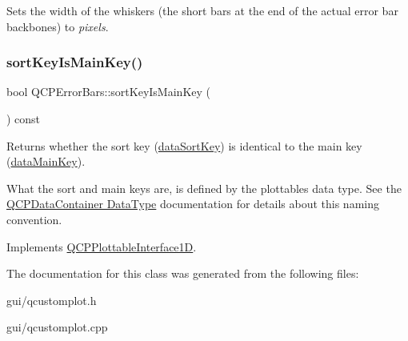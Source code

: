 Sets the width of the whiskers (the short bars at the end of the actual error bar backbones) to {\itshape pixels}. \mbox{\label{classQCPErrorBars_af75958b95d9b9c7edfd9851c1d123850}} 
\subsubsection{\texorpdfstring{sort\+Key\+Is\+Main\+Key()}{sortKeyIsMainKey()}}
{\footnotesize\ttfamily bool Q\+C\+P\+Error\+Bars\+::sort\+Key\+Is\+Main\+Key (\begin{DoxyParamCaption}{ }\end{DoxyParamCaption}) const\hspace{0.3cm}{\ttfamily [virtual]}}

Returns whether the sort key (\hyperlink{classQCPErrorBars_a3000a036124880a90c629d124c1cd1e2}{data\+Sort\+Key}) is identical to the main key (\hyperlink{classQCPErrorBars_a7cba420078adc523efa59fb8c6ca23e0}{data\+Main\+Key}).

What the sort and main keys are, is defined by the plottable\textquotesingle{}s data type. See the \hyperlink{classQCPDataContainer_qcpdatacontainer-datatype}{Q\+C\+P\+Data\+Container Data\+Type} documentation for details about this naming convention. 

Implements \hyperlink{classQCPPlottableInterface1D_a229e65e7ab968dd6cd0e259fa504b79d}{Q\+C\+P\+Plottable\+Interface1D}.



The documentation for this class was generated from the following files\+:\begin{DoxyCompactItemize}
\item 
gui/qcustomplot.\+h\item 
gui/qcustomplot.\+cpp\end{DoxyCompactItemize}
